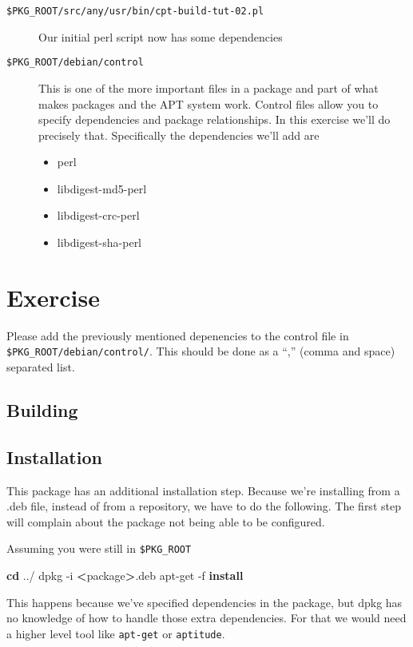 \documentclass[]{article}
\newenvironment{Shaded}{}{}
\newcommand{\KeywordTok}[1]{\textcolor[rgb]{0.00,0.44,0.13}{\textbf{{#1}}}}
\newcommand{\OtherTok}[1]{\textcolor[rgb]{0.00,0.44,0.13}{{#1}}}
\newcommand{\NormalTok}[1]{{#1}}
\begin{document}
\begin{description}
\item[\texttt{\$PKG\_ROOT/src/any/usr/bin/cpt-build-tut-02.pl}]
Our initial perl script now has some dependencies

\item[\texttt{\$PKG\_ROOT/debian/control}]
This is one of the more important files in a package and part of what
makes packages and the APT system work. Control files allow you to
specify dependencies and package relationships. In this exercise we'll
do precisely that. Specifically the dependencies we'll add are

\begin{itemize}
\item
  perl
\item
  libdigest-md5-perl
\item
  libdigest-crc-perl
\item
  libdigest-sha-perl
\end{itemize}
\end{description}
\section{Exercise}

Please add the previously mentioned depenencies to the control file in
\texttt{\$PKG\_ROOT/debian/control/}. This should be done as a ``,''
(comma and space) separated list.

\subsection{Building}

\begin{Shaded}
\end{Shaded}
\subsection{Installation}

This package has an additional installation step. Because we're
installing from a .deb file, instead of from a repository, we have to do
the following. The first step will complain about the package not being
able to be configured.

Assuming you were still in \texttt{\$PKG\_ROOT}

\begin{Shaded}
\begin{Highlighting}[]
\KeywordTok{cd} \NormalTok{../}
\NormalTok{dpkg -i }\KeywordTok{<}\NormalTok{package}\KeywordTok{>}\NormalTok{.deb}
\NormalTok{apt-get -f }\KeywordTok{install}
\end{Highlighting}
\end{Shaded}
This happens because we've specified dependencies in the package, but
dpkg has no knowledge of how to handle those extra dependencies. For
that we would need a higher level tool like \texttt{apt-get} or
\texttt{aptitude}.
\end{document}
